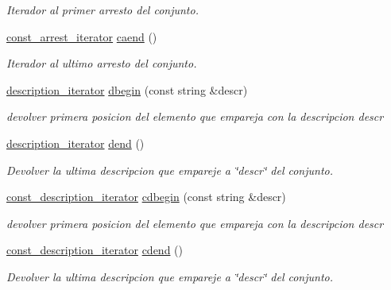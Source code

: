 \begin{DoxyCompactItemize}
\begin{DoxyCompactList}\small\item\em Iterador al primer arresto del conjunto. \end{DoxyCompactList}\item 
\hyperlink{classconjunto_1_1const__arrest__iterator}{const\+\_\+arrest\+\_\+iterator} \hyperlink{classconjunto_ad60c36087d6cc561a0555305cefb0e4e}{caend} ()
\begin{DoxyCompactList}\small\item\em Iterador al ultimo arresto del conjunto. \end{DoxyCompactList}\item 
\hyperlink{classconjunto_1_1description__iterator}{description\+\_\+iterator} \hyperlink{classconjunto_a401934160b45e345b3a24dc8d19a876e}{dbegin} (const string \&descr)
\begin{DoxyCompactList}\small\item\em devolver primera posicion del elemento que empareja con la descripcion descr \end{DoxyCompactList}\item 
\hyperlink{classconjunto_1_1description__iterator}{description\+\_\+iterator} \hyperlink{classconjunto_afac0a0cbea194ffae3a65e4a6c2db8cc}{dend} ()
\begin{DoxyCompactList}\small\item\em Devolver la ultima descripcion que empareje a \char`\"{}descr\char`\"{} del conjunto. \end{DoxyCompactList}\item 
\hyperlink{classconjunto_1_1const__description__iterator}{const\+\_\+description\+\_\+iterator} \hyperlink{classconjunto_a8d7d4e0af87adb5d7a4d003b4d268417}{cdbegin} (const string \&descr)
\begin{DoxyCompactList}\small\item\em devolver primera posicion del elemento que empareja con la descripcion descr \end{DoxyCompactList}\item 
\hyperlink{classconjunto_1_1const__description__iterator}{const\+\_\+description\+\_\+iterator} \hyperlink{classconjunto_ac85bbf9bd37f810ce248b10900f3470a}{cdend} ()
\begin{DoxyCompactList}\small\item\em Devolver la ultima descripcion que empareje a \char`\"{}descr\char`\"{} del conjunto. \end{DoxyCompactList}\end{DoxyCompactItemize}
